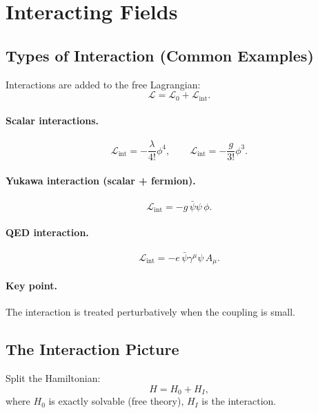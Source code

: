 \section{Interacting Fields}

\subsection{Types of Interaction (Common Examples)}
Interactions are added to the free Lagrangian:
\begin{equation}
\mathcal{L}=\mathcal{L}_0+\mathcal{L}_{\mathrm{int}}.
\end{equation}

\paragraph{Scalar interactions.}
\begin{equation}
\mathcal{L}_{\mathrm{int}}=-\frac{\lambda}{4!}\phi^4,
\qquad
\mathcal{L}_{\mathrm{int}}=-\frac{g}{3!}\phi^3.
\end{equation}

\paragraph{Yukawa interaction (scalar + fermion).}
\begin{equation}
\mathcal{L}_{\mathrm{int}}=-g\,\bar{\psi}\psi\,\phi.
\end{equation}

\paragraph{QED interaction.}
\begin{equation}
\mathcal{L}_{\mathrm{int}}=-e\,\bar{\psi}\gamma^\mu\psi\,A_\mu.
\end{equation}

\paragraph{Key point.}
The interaction is treated perturbatively when the coupling is small.

\subsection{The Interaction Picture}
Split the Hamiltonian:
\begin{equation}
H = H_0 + H_I,
\end{equation}
where $H_0$ is exactly solvable (free theory), $H_I$ is the interaction.

